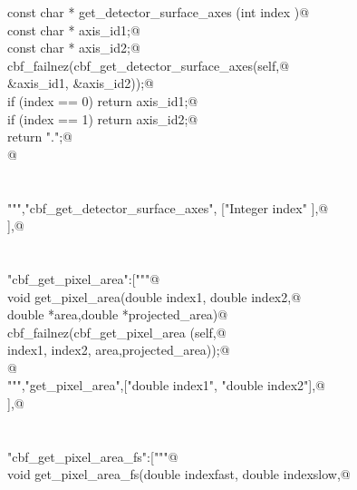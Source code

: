\documentclass[10pt,a4paper,twoside,notitlepage]{article}
\begin{document}
\begin{flushleft}
\begin{minipage}{\linewidth}
\begin{list}{}{}
\mbox{}\verb@   const char * get_detector_surface_axes (int index ){@\\
\mbox{}\verb@       const char * axis_id1;@\\
\mbox{}\verb@       const char * axis_id2;@\\
\mbox{}\verb@       cbf_failnez(cbf_get_detector_surface_axes(self,@\\
\mbox{}\verb@                                    &axis_id1, &axis_id2));@\\
\mbox{}\verb@       if (index == 0) return axis_id1;@\\
\mbox{}\verb@       if (index == 1) return axis_id2;@\\
\mbox{}\verb@       return ".";@\\
\mbox{}\verb@   }@\\
\mbox{}\verb@@\\
\mbox{}\verb@@\\
\mbox{}\verb@""","cbf_get_detector_surface_axes", ["Integer index" ],@\\
\mbox{}\verb@ ["String" ] ],@\\
\mbox{}\verb@@\\
\mbox{}\verb@@\\
\mbox{}\verb@"cbf_get_pixel_area":["""@\\
\mbox{}\verb@%apply double *OUTPUT{double *area,double *projected_area};@\\
\mbox{}\verb@    void get_pixel_area(double index1, double index2,@\\
\mbox{}\verb@                        double *area,double *projected_area){@\\
\mbox{}\verb@       cbf_failnez(cbf_get_pixel_area (self,@\\
\mbox{}\verb@                                       index1, index2, area,projected_area));@\\
\mbox{}\verb@      }@\\
\mbox{}\verb@""","get_pixel_area",["double index1", "double index2"],@\\
\mbox{} ],@\\
\mbox{}\verb@@\\
\mbox{}\verb@@\\
\mbox{}\verb@"cbf_get_pixel_area_fs":["""@\\
\mbox{}\verb@%apply double *OUTPUT{double *area,double *projected_area};@\\
\mbox{}\verb@    void get_pixel_area_fs(double indexfast, double indexslow,@\\

\end{list}
\end{minipage}
\end{flushleft}
\end{document}
